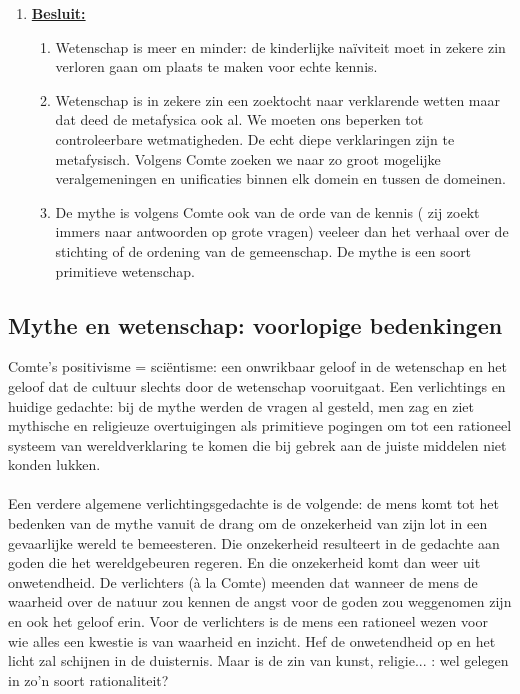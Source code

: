 \documentclass[11pt,a4paper]{article}
\begin{document}
\begin{enumerate}
\item[] \underline{\textbf{Besluit:}}
\begin{enumerate}
\item Wetenschap is meer en minder: de kinderlijke naïviteit moet in zekere zin verloren gaan om plaats te maken voor echte kennis.
\item Wetenschap is in zekere zin een zoektocht naar verklarende wetten maar dat deed de metafysica ook al. We moeten ons beperken tot controleerbare wetmatigheden. De echt diepe verklaringen zijn te metafysisch.
Volgens Comte zoeken we naar zo groot mogelijke veralgemeningen en unificaties binnen elk domein en tussen de domeinen.
\item De mythe is volgens Comte ook van de orde van de kennis ( zij zoekt immers naar antwoorden op grote vragen) veeleer dan het verhaal over de stichting of de ordening van de gemeenschap. De mythe is een soort primitieve wetenschap.
\end{enumerate}
\end{enumerate}
\subsection{Mythe en wetenschap: voorlopige bedenkingen}
Comte's positivisme = sci\"entisme: een onwrikbaar geloof in de wetenschap en het geloof dat de cultuur slechts door de wetenschap vooruitgaat. Een verlichtings en huidige gedachte: bij de mythe werden de vragen al gesteld, men zag en ziet mythische en religieuze overtuigingen als primitieve pogingen om tot een rationeel systeem van wereldverklaring te komen die bij gebrek aan de juiste middelen niet konden lukken.
\\ \\
Een verdere algemene verlichtingsgedachte is de volgende: de mens komt tot het bedenken van de mythe vanuit de drang om de onzekerheid van zijn lot in een gevaarlijke wereld te bemeesteren. Die onzekerheid resulteert in de gedachte aan goden die het wereldgebeuren regeren. En die onzekerheid komt dan weer uit onwetendheid. De verlichters (\`a la Comte) meenden dat wanneer de mens de waarheid over de natuur zou kennen de angst voor de goden zou weggenomen zijn en ook het geloof erin. Voor de verlichters is de mens een rationeel wezen voor wie alles een kwestie is van waarheid en inzicht. Hef de onwetendheid op en het licht zal schijnen in de duisternis.
Maar is de zin van kunst, religie... : wel gelegen in zo'n soort rationaliteit?
\end{document}
